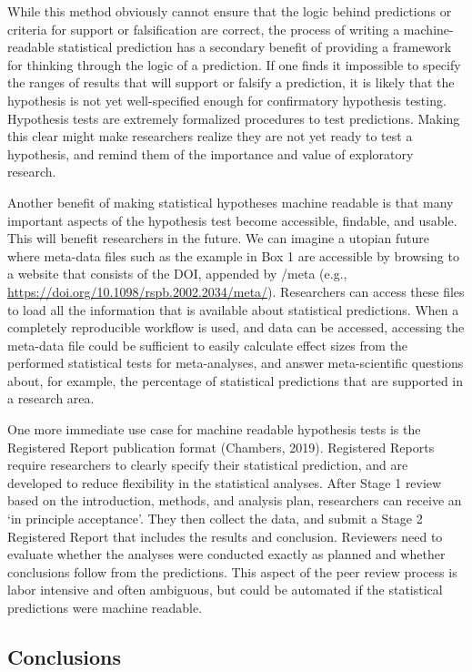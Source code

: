 \documentclass[doc,floatsintext]{apa6}
\begin{document}
While this method obviously cannot ensure that the logic behind predictions or criteria for support or falsification are correct, the process of writing a machine-readable statistical prediction has a secondary benefit of providing a framework for thinking through the logic of a prediction. If one finds it impossible to specify the ranges of results that will support or falsify a prediction, it is likely that the hypothesis is not yet well-specified enough for confirmatory hypothesis testing. Hypothesis tests are extremely formalized procedures to test predictions. Making this clear might make researchers realize they are not yet ready to test a hypothesis, and remind them of the importance and value of exploratory research.

Another benefit of making statistical hypotheses machine readable is that many important aspects of the hypothesis test become accessible, findable, and usable. This will benefit researchers in the future. We can imagine a utopian future where meta-data files such as the example in Box 1 are accessible by browsing to a website that consists of the DOI, appended by /meta (e.g., \url{https://doi.org/10.1098/rspb.2002.2034/meta/}). Researchers can access these files to load all the information that is available about statistical predictions. When a completely reproducible workflow is used, and data can be accessed, accessing the meta-data file could be sufficient to easily calculate effect sizes from the performed statistical tests for meta-analyses, and answer meta-scientific questions about, for example, the percentage of statistical predictions that are supported in a research area.

One more immediate use case for machine readable hypothesis tests is the Registered Report publication format (Chambers, 2019). Registered Reports require researchers to clearly specify their statistical prediction, and are developed to reduce flexibility in the statistical analyses. After Stage 1 review based on the introduction, methods, and analysis plan, researchers can receive an `in principle acceptance'. They then collect the data, and submit a Stage 2 Registered Report that includes the results and conclusion. Reviewers need to evaluate whether the analyses were conducted exactly as planned and whether conclusions follow from the predictions. This aspect of the peer review process is labor intensive and often ambiguous, but could be automated if the statistical predictions were machine readable.

\hypertarget{conclusions}{%
\subsection{Conclusions}\label{conclusions}}
\end{document}
